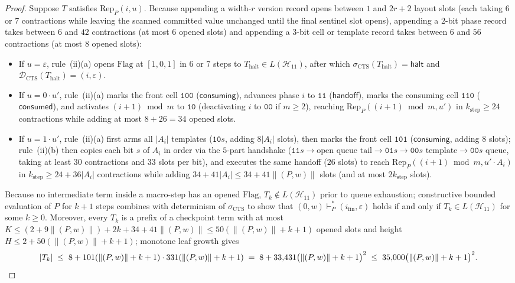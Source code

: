 \documentclass[11pt,reqno]{amsart}
\numberwithin{equation}{section}
\theoremstyle{plain}
\theoremstyle{definition}
\theoremstyle{remark}
\begin{document}
\begin{proof}
Suppose $T$ satisfies $\mathrm{Rep}_P(i, u)$. Because appending a width-$r$ version record opens between $1$ and $2r + 2$ layout slots (each taking $6$ or $7$ contractions while leaving the scanned committed value unchanged until the final sentinel slot opens), appending a $2$-bit phase record takes between $6$ and $42$ contractions (at most $6$ opened slots) and appending a $3$-bit cell or template record takes between $6$ and $56$ contractions (at most $8$ opened slots):
\begin{itemize}[leftmargin=2.0em]
  \item If $u = \varepsilon$, rule~(ii)(a) opens $\mathrm{Flag}$ at $[1,0,1]$ in $6$ or $7$ steps to $T_{\mathrm{halt}} \in L(\mathcal{H}_{11})$, after which $\sigma_{\mathrm{CTS}}(T_{\mathrm{halt}}) = \mathsf{halt}$ and $\mathcal{D}_{\mathrm{CTS}}(T_{\mathrm{halt}}) = (i, \varepsilon)$.
  \item If $u = 0\cdot u'$, rule~(ii)(a) marks the front cell $\mathtt{100}$ ($\mathsf{consuming}$), advances phase $i$ to $\mathtt{11}$ ($\mathsf{handoff}$), marks the consuming cell $\mathtt{110}$ ($\mathsf{consumed}$), and activates $(i+1) \bmod m$ to $\mathtt{10}$ (deactivating $i$ to $\mathtt{00}$ if $m \ge 2$), reaching $\mathrm{Rep}_P((i+1) \bmod m, u')$ in $k_{\mathrm{step}} \ge 24$ contractions while adding at most $8 + 26 = 34$ opened slots.
  \item If $u = 1\cdot u'$, rule~(ii)(a) first arms all $|A_i|$ templates ($\mathtt{10}s$, adding $8|A_i|$ slots), then marks the front cell $\mathtt{101}$ ($\mathsf{consuming}$, adding $8$ slots); rule~(ii)(b) then copies each bit $s$ of $A_i$ in order via the $5$-part handshake ($\mathtt{11}s \to \text{open queue tail} \to \mathtt{01}s \to \mathtt{00}s\text{ template} \to \mathtt{00}s\text{ queue}$, taking at least $30$ contractions and $33$ slots per bit), and executes the same handoff ($26$ slots) to reach $\mathrm{Rep}_P((i+1)\bmod m, u'\cdot A_i)$ in $k_{\mathrm{step}} \ge 24 + 36|A_i|$ contractions while adding $34 + 41|A_i| \le 34 + 41\|(P,w)\|$ slots (and at most $2 k_{\mathrm{step}}$ slots).
\end{itemize}
Because no intermediate term inside a macro-step has an opened $\mathrm{Flag}$, $T_k \notin L(\mathcal{H}_{11})$ prior to queue exhaustion; constructive bounded evaluation of $P$ for $k + 1$ steps combines with determinism of $\sigma_{\mathrm{CTS}}$ to show that $(0, w) \vdash_P^* (i_{\mathrm{fin}}, \varepsilon)$ holds if and only if $T_k \in L(\mathcal{H}_{11})$ for some $k \ge 0$. Moreover, every $T_k$ is a prefix of a checkpoint term with at most $K \le (2 + 9\|(P,w)\|) + 2k + 34 + 41\|(P,w)\| \le 50(\|(P,w)\| + k + 1)$ opened slots and height $H \le 2 + 50(\|(P,w)\| + k + 1)$; monotone leaf growth gives
\[
  |T_k| \;\le\; 8 + 101(\|(P,w)\|+k+1)\cdot 331(\|(P,w)\|+k+1) \;=\; 8 + 33{,}431\bigl(\|(P,w)\|+k+1\bigr)^2 \;\le\; 35{,}000\bigl(\|(P,w)\|+k+1\bigr)^2. \qedhere
\]
\end{proof}
\end{document}
